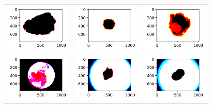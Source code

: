 \begin{figure}[!b]
    \centering
    \begin{tabular}{ccc}
        \includegraphics[width=4cm]{../Plots/THR/filtered_0.png} &
        \includegraphics[width=4cm]{../Plots/THR/filtered_1.png} &
        \includegraphics[width=4cm]{../Plots/THR/filtered_2.png} \\

        \includegraphics[width=4cm]{../Plots/THR/filtered_3.png} &
        \includegraphics[width=4cm]{../Plots/THR/filtered_4.png} &
        \includegraphics[width=4cm]{../Plots/THR/filtered_5.png} \\
        

\end{tabular}
\end{figure}
